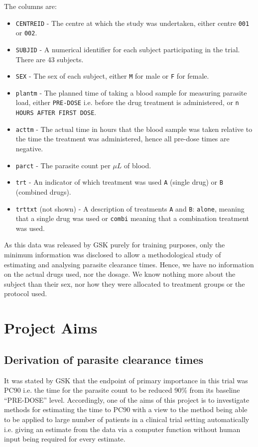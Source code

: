 The columns are:
\begin{itemize}
\item\texttt{CENTREID} - The centre at which the study was undertaken, either centre \texttt{001} or \texttt{002}.
\item\texttt{SUBJID} - A numerical identifier for each subject participating in the trial. There are 43 subjects.
\item\texttt{SEX} - The sex of each subject, either \texttt{M} for male or \texttt{F} for female.
\item\texttt{plantm} - The planned time of taking a blood sample for measuring parasite load, either \texttt{PRE-DOSE} i.e. before the drug treatment is administered, or \texttt{n HOURS AFTER FIRST DOSE}.
\item\texttt{acttm} - The actual time in hours that the blood sample was taken relative to the time the treatment was administered, hence all pre-dose times are negative.
\item\texttt{parct} - The parasite count per $\mu L$ of blood.
\item\texttt{trt} - An indicator of which treatment was used \texttt{A} (single drug) or \texttt{B} (combined drugs).
\item\texttt{trttxt} (not shown) - A description of treatments \texttt{A} and \texttt{B}: \texttt{alone}, meaning that a single drug was used or \texttt{combi} meaning that a combination treatment was used.
\end{itemize}

As this data was released by GSK purely for training purposes, only the minimum information was disclosed to allow a methodological study of estimating and analysing parasite clearance times. Hence, we have no information on the actual drugs used, nor the dosage. We know nothing more about the subject than their sex, nor how they were allocated to treatment groups or the protocol used.

\section{Project Aims}
\subsection{Derivation of parasite clearance times}
It was stated by GSK that the endpoint of primary importance in this trial was PC90 i.e. the time for the parasite count to be reduced 90\% from its baseline ``PRE-DOSE'' level. Accordingly, one of the aims of this project is to investigate methods for estimating the time to PC90 with a view to the method being able to be applied to large number of patients in a clinical trial setting automatically i.e. giving an estimate from the data via a computer function without human input being required for every estimate.

